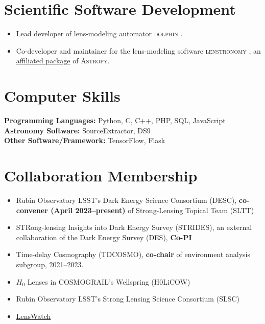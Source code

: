 \documentclass[margin, line]{res}
\newenvironment{list2}{
  \begin{list}{$\bullet$}{%
      \setlength{\itemsep}{0in}
      \setlength{\parsep}{0in} \setlength{\parskip}{0in}
      \setlength{\topsep}{0in} \setlength{\partopsep}{0in} 
      \setlength{\leftmargin}{0.2in}}}{\end{list}}
\begin{document}
\begin{resume}
\section{\sc Scientific Software Development} 
\begin{itemize}
	\item Lead developer of lens-modeling automator \textsc{dolphin} \href{https://github.com/ajshajib/dolphin}{\faGithub}.
	\item Co-developer and maintainer for the lens-modeling software \textsc{lenstronomy} \href{https://github.com/lenstronomy/lenstronomy}{\faGithub}, an \href{https://www.astropy.org/affiliated/index.html}{affiliated package} of \textsc{Astropy}.
\end{itemize}

\section{\sc Computer Skills} 
\textbf{Programming Languages:} Python, C, C++, PHP, SQL, JavaScript \\
\textbf{Astronomy Software:} SourceExtractor, DS9 \\
\textbf{Other Software/Framework:} TensorFlow, Flask


\section{\sc Collaboration Membership}
\begin{itemize}
	\item Rubin Observatory LSST's Dark Energy Science Consortium (DESC), \textbf{co-convener (April 2023--present)} of Strong-Lensing Topical Team (SLTT) 
	\item STRong-lensing Insights into Dark Energy Survey (STRIDES), an external collaboration of the Dark Energy Survey (DES), \textbf{Co-PI}
	\item Time-delay Cosmography (TDCOSMO), \textbf{co-chair} of environment analysis subgroup, 2021--2023.
	\item $H_0$ Lenses in COSMOGRAIL's Wellspring (H0LiCOW)
	\item Rubin Observatory LSST's Strong Lensing Science Consortium (SLSC)
	\item \href{https://www.lenswatch.org/}{LensWatch}
\end{itemize}


\end{resume}
\end{document}
